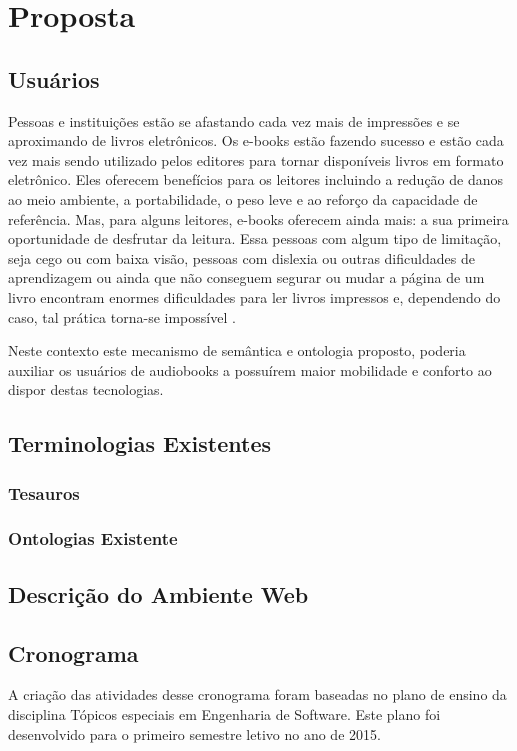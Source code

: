 \chapter{Proposta}\label{cap4}

\section{Usuários}

Pessoas e instituições estão se afastando cada vez mais de impressões e se aproximando de livros eletrônicos. Os e-books estão fazendo sucesso e estão cada vez mais sendo utilizado pelos editores para tornar disponíveis livros em formato eletrônico. Eles oferecem benefícios para os leitores incluindo a redução de danos ao meio ambiente, a portabilidade, o peso leve e ao reforço da capacidade de referência. Mas, para alguns leitores, e-books oferecem ainda mais: a sua primeira oportunidade de desfrutar da leitura. Essa pessoas com algum tipo de limitação, seja cego ou com baixa visão, pessoas com dislexia ou outras dificuldades de aprendizagem ou ainda que não conseguem segurar ou mudar a página de um livro encontram enormes dificuldades para ler livros impressos e, dependendo do caso, tal prática torna-se impossível \cite{chronicle}.

Neste contexto este mecanismo de semântica e ontologia proposto, poderia auxiliar os usuários de audiobooks a possuírem maior mobilidade e conforto ao dispor destas tecnologias.

\section{Terminologias Existentes}

\subsection{Tesauros}

\subsection{Ontologias Existente}


\section{Descrição do Ambiente Web}


\section{Cronograma}
A criação das atividades desse cronograma foram baseadas no plano de ensino da disciplina Tópicos especiais em Engenharia de Software. Este plano foi desenvolvido para o primeiro semestre letivo no ano de 2015.

